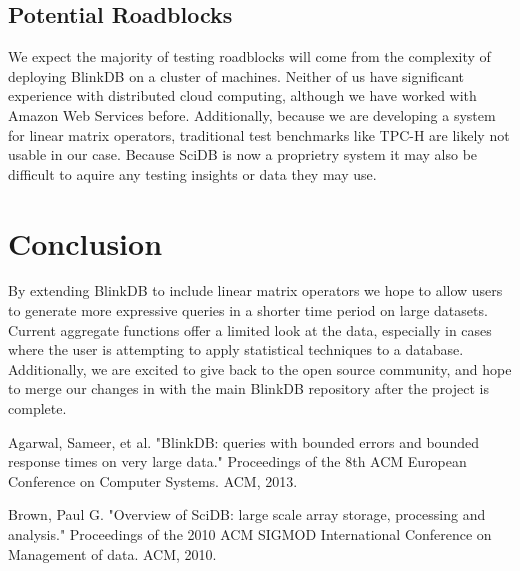\documentclass[twoside]{article}
\begin{document}
\begin{multicols}{2}
\subsection{Potential Roadblocks}
We expect the majority of testing roadblocks will come from the complexity of deploying BlinkDB on a cluster of machines. Neither of us have significant experience with distributed cloud computing, although we have worked with Amazon Web Services before. Additionally, because we are developing a system for linear matrix operators, traditional test benchmarks like TPC-H are likely not usable in our case. Because SciDB is now a proprietry system it may also be difficult to aquire any testing insights or data they may use.

\section{Conclusion}
By extending BlinkDB to include linear matrix operators we hope to allow users to generate more expressive queries in a shorter time period on large datasets. Current aggregate functions offer a limited look at the data, especially in cases where the user is attempting to apply statistical techniques to a database. Additionally, we are excited to give back to the open source community, and hope to merge our changes in with the main BlinkDB repository after the project is complete.


\begin{thebibliography}{99} %

Agarwal, Sameer, et al. "BlinkDB: queries with bounded errors and bounded response times on very large data." Proceedings of the 8th ACM European Conference on Computer Systems. ACM, 2013.

Brown, Paul G. "Overview of SciDB: large scale array storage, processing and analysis." Proceedings of the 2010 ACM SIGMOD International Conference on Management of data. ACM, 2010.
 
\end{thebibliography}


\end{multicols}
\end{document}
